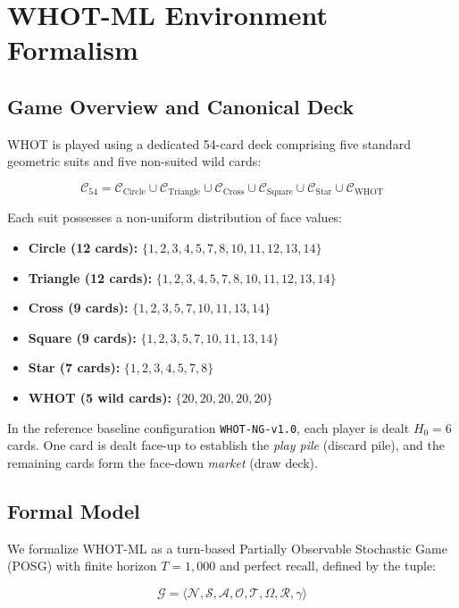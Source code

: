 \documentclass[11pt]{article}
\begin{document}
\section{WHOT-ML Environment Formalism}

\subsection{Game Overview and Canonical Deck}
WHOT is played using a dedicated 54-card deck comprising five standard geometric suits and five non-suited wild cards:

\[
\mathcal{C}_{54} = \mathcal{C}_{\text{Circle}} \cup \mathcal{C}_{\text{Triangle}} \cup \mathcal{C}_{\text{Cross}} \cup \mathcal{C}_{\text{Square}} \cup \mathcal{C}_{\text{Star}} \cup \mathcal{C}_{\text{WHOT}}
\]

Each suit possesses a non-uniform distribution of face values:
\begin{itemize}
  \item \textbf{Circle (12 cards):} $\{1, 2, 3, 4, 5, 7, 8, 10, 11, 12, 13, 14\}$
  \item \textbf{Triangle (12 cards):} $\{1, 2, 3, 4, 5, 7, 8, 10, 11, 12, 13, 14\}$
  \item \textbf{Cross (9 cards):} $\{1, 2, 3, 5, 7, 10, 11, 13, 14\}$
  \item \textbf{Square (9 cards):} $\{1, 2, 3, 5, 7, 10, 11, 13, 14\}$
  \item \textbf{Star (7 cards):} $\{1, 2, 3, 4, 5, 7, 8\}$
  \item \textbf{WHOT (5 wild cards):} $\{20, 20, 20, 20, 20\}$
\end{itemize}

In the reference baseline configuration \texttt{WHOT-NG-v1.0}, each player is dealt $H_0 = 6$ cards. One card is dealt face-up to establish the \textit{play pile} (discard pile), and the remaining cards form the face-down \textit{market} (draw deck).

\subsection{Formal Model}
We formalize WHOT-ML as a turn-based Partially Observable Stochastic Game (POSG) with finite horizon $T=1{,}000$ and perfect recall, defined by the tuple:

\[
\mathcal{G} = \langle \mathcal{N}, \mathcal{S}, \mathcal{A}, \mathcal{O}, \mathcal{T}, \Omega, \mathcal{R}, \gamma \rangle
\]
\end{document}
